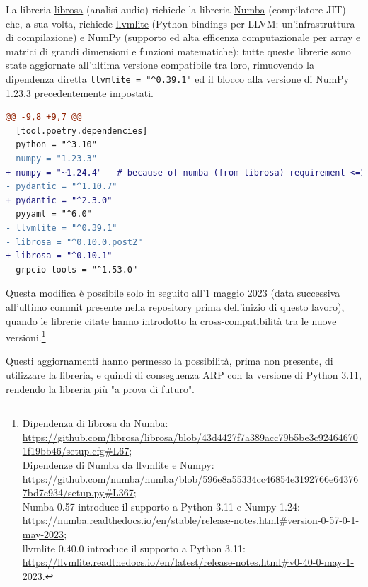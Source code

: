 La libreria \href{https://librosa.org/}{librosa} (analisi audio) richiede la libreria \href{https://numba.pydata.org/}{Numba} (compilatore JIT) che, a sua volta, richiede \href{https://llvmlite.readthedocs.io/en/latest/}{llvmlite} (Python bindings per LLVM: un'infrastruttura di compilazione) e \href{https://numpy.org/}{NumPy} (supporto ed alta efficenza computazionale per array e matrici di grandi dimensioni e funzioni matematiche); tutte queste librerie sono state aggiornate all'ultima versione compatibile tra loro, rimuovendo la dipendenza diretta \verb|llvmlite = "^0.39.1"| ed il blocco alla versione di NumPy 1.23.3 precedentemente impostati.
\begin{lstlisting}[language=diff, caption={\texttt{pyproject.toml}, aggiornamento delle dipendenze}]
@@ -9,8 +9,7 @@
  [tool.poetry.dependencies]
  python = "^3.10"
- numpy = "1.23.3"
+ numpy = "~1.24.4"   # because of numba (from librosa) requirement <=1.24
- pydantic = "^1.10.7"
+ pydantic = "^2.3.0"
  pyyaml = "^6.0"
- llvmlite = "^0.39.1" 
- librosa = "^0.10.0.post2"
+ librosa = "^0.10.1"
  grpcio-tools = "^1.53.0"
\end{lstlisting}
Questa modifica è possibile solo in seguito all'1 maggio 2023 (data successiva all'ultimo commit presente nella repository prima dell'inizio di questo lavoro), quando le librerie citate hanno introdotto la cross-compatibilità tra le nuove versioni.\footnote{Dipendenza di librosa da Numba: \url{https://github.com/librosa/librosa/blob/43d4427f7a389acc79b5be3c924646701f19bb46/setup.cfg\#L67};\\
Dipendenze di Numba da llvmlite e Numpy: \url{https://github.com/numba/numba/blob/596e8a55334cc46854e3192766e643767bd7c934/setup.py\#L367};\\
Numba 0.57 introduce il supporto a Python 3.11 e Numpy 1.24: \url{https://numba.readthedocs.io/en/stable/release-notes.html\#version-0-57-0-1-may-2023};\\
llvmlite 0.40.0 introduce il supporto a Python 3.11: \url{https://llvmlite.readthedocs.io/en/latest/release-notes.html\#v0-40-0-may-1-2023}.}

Questi aggiornamenti hanno permesso la possibilità, prima non presente, di utilizzare la libreria, e quindi di conseguenza \ac{ARP} con la versione di Python 3.11, rendendo la libreria più "a prova di futuro".
